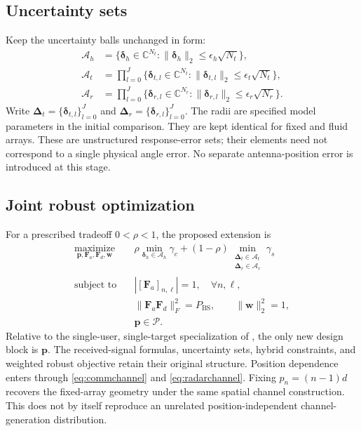 \documentclass[11pt]{article}
\newcommand{\Fa}{\mathbf F_a}
\newcommand{\Fd}{\mathbf F_d}
\newcommand{\pos}{\mathbf p}
\begin{document}
\subsection{Uncertainty sets}
Keep the uncertainty balls unchanged in form:
\begin{align}
 \mathcal A_h&=\{\bm\delta_h\in\mathbb C^{N_t}:
 \|\bm\delta_h\|_2\leq\epsilon_h\sqrt{N_t}\},\\
 \mathcal A_t&=\prod_{l=0}^{J}\{\bm\delta_{t,l}\in\mathbb C^{N_t}:
 \|\bm\delta_{t,l}\|_2\leq\epsilon_t\sqrt{N_t}\},\\
 \mathcal A_r&=\prod_{l=0}^{J}\{\bm\delta_{r,l}\in\mathbb C^{N_r}:
 \|\bm\delta_{r,l}\|_2\leq\epsilon_r\sqrt{N_r}\}.
\end{align}
Write $\bm\Delta_t=\{\bm\delta_{t,l}\}_{l=0}^{J}$ and
$\bm\Delta_r=\{\bm\delta_{r,l}\}_{l=0}^{J}$.
The radii are specified model parameters in the initial comparison.
They are kept identical for fixed and fluid arrays. These are unstructured
response-error sets; their elements need not correspond to a single physical
angle error. No separate antenna-position error is introduced at this stage.

\subsection{Joint robust optimization}
For a prescribed tradeoff $0<\rho<1$, the proposed extension is
\begin{equation}
\begin{aligned}
 \underset{\pos,\Fa,\Fd,\mathbf w}{\operatorname{maximize}}\quad
 &\rho\min_{\bm\delta_h\in\mathcal A_h}\gamma_c
 +(1-\rho)\min_{\substack{\bm\Delta_t\in\mathcal A_t\\
                          \bm\Delta_r\in\mathcal A_r}}\gamma_s\\
 \text{subject to}\quad
 &|[\Fa]_{n,\ell}|=1,\quad\forall n,\ell,\\
 &\|\Fa\Fd\|_F^2=P_{\mathrm{BS}},\qquad\|\mathbf w\|_2^2=1,\\
 &\pos\in\mathcal P.
\end{aligned}
\label{eq:problem}
\end{equation}
Relative to the single-user, single-target specialization of \cite{wang2026},
the only new design block is $\pos$. The received-signal formulas, uncertainty
sets, hybrid constraints, and weighted robust objective retain their original
structure. Position dependence enters through \eqref{eq:commchannel} and
\eqref{eq:radarchannel}. Fixing $p_n=(n-1)d$ recovers the fixed-array geometry
under the same spatial channel construction. This does not by itself reproduce
an unrelated position-independent channel-generation distribution.
\end{document}
